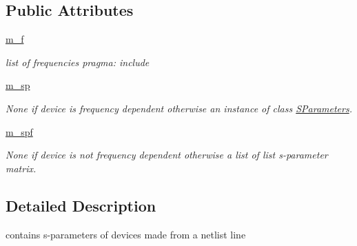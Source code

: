 \subsection*{Public Attributes}
\begin{DoxyCompactItemize}
\item 
\mbox{\label{classSignalIntegrity_1_1Parsers_1_1Devices_1_1DeviceParser_1_1DeviceParser_a40a26fb5046a51e40dd1b61c78d72ace}} 
\hyperlink{classSignalIntegrity_1_1Parsers_1_1Devices_1_1DeviceParser_1_1DeviceParser_a40a26fb5046a51e40dd1b61c78d72ace}{m\+\_\+f}
\begin{DoxyCompactList}\small\item\em list of frequencies pragma\+: include \end{DoxyCompactList}\item 
\mbox{\label{classSignalIntegrity_1_1Parsers_1_1Devices_1_1DeviceParser_1_1DeviceParser_aeca0e75de33f68cf0f94eb5c932037bd}} 
\hyperlink{classSignalIntegrity_1_1Parsers_1_1Devices_1_1DeviceParser_1_1DeviceParser_aeca0e75de33f68cf0f94eb5c932037bd}{m\+\_\+sp}
\begin{DoxyCompactList}\small\item\em None if device is frequency dependent otherwise an instance of class \hyperlink{namespaceSignalIntegrity_1_1SParameters}{S\+Parameters}. \end{DoxyCompactList}\item 
\mbox{\label{classSignalIntegrity_1_1Parsers_1_1Devices_1_1DeviceParser_1_1DeviceParser_a5bad8e400189aa634b24535daee44ee0}} 
\hyperlink{classSignalIntegrity_1_1Parsers_1_1Devices_1_1DeviceParser_1_1DeviceParser_a5bad8e400189aa634b24535daee44ee0}{m\+\_\+spf}
\begin{DoxyCompactList}\small\item\em None if device is not frequency dependent otherwise a list of list s-\/parameter matrix. \end{DoxyCompactList}\end{DoxyCompactItemize}


\subsection{Detailed Description}
contains s-\/parameters of devices made from a netlist line 


